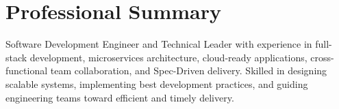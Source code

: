 \section*{Professional Summary}
Software Development Engineer and Technical Leader with experience in full-stack development, microservices architecture, cloud-ready applications, cross-functional team collaboration, and Spec-Driven delivery. Skilled in designing scalable systems, implementing best development practices, and guiding engineering teams toward efficient and timely delivery.
